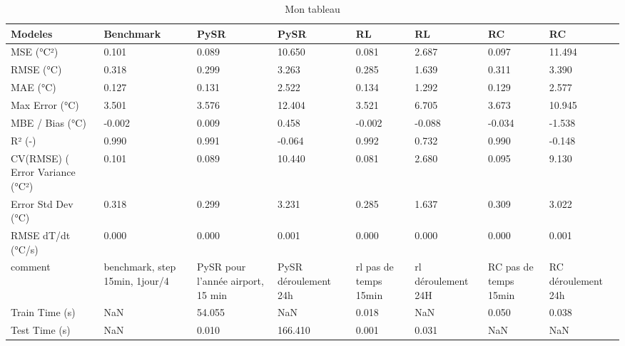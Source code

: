 \begin{table}
\caption{Mon tableau}
\label{tab:mon_tableau}
\begin{tabular}{llllllll}
\toprule
Modeles & Benchmark & PySR & PySR & RL & RL & RC & RC \\
\midrule
MSE (°C²) & 0.101 & 0.089 & 10.650 & 0.081 & 2.687 & 0.097 & 11.494 \\
RMSE (°C) & 0.318 & 0.299 & 3.263 & 0.285 & 1.639 & 0.311 & 3.390 \\
MAE (°C) & 0.127 & 0.131 & 2.522 & 0.134 & 1.292 & 0.129 & 2.577 \\
Max Error (°C) & 3.501 & 3.576 & 12.404 & 3.521 & 6.705 & 3.673 & 10.945 \\
MBE / Bias (°C) & -0.002 & 0.009 & 0.458 & -0.002 & -0.088 & -0.034 & -1.538 \\
R² (-) & 0.990 & 0.991 & -0.064 & 0.992 & 0.732 & 0.990 & -0.148 \\
CV(RMSE) (%
Error Variance (°C²) & 0.101 & 0.089 & 10.440 & 0.081 & 2.680 & 0.095 & 9.130 \\
Error Std Dev (°C) & 0.318 & 0.299 & 3.231 & 0.285 & 1.637 & 0.309 & 3.022 \\
RMSE dT/dt (°C/s) & 0.000 & 0.000 & 0.001 & 0.000 & 0.000 & 0.000 & 0.001 \\
comment & benchmark, step 15min, 1jour/4 & PySR pour l'année airport, 15 min & PySR déroulement 24h & rl pas de temps 15min & rl déroulement 24H & RC pas de temps 15min & RC déroulement 24h \\
Train Time (s) & NaN & 54.055 & NaN & 0.018 & NaN & 0.050 & 0.038 \\
Test Time (s) & NaN & 0.010 & 166.410 & 0.001 & 0.031 & NaN & NaN \\
\bottomrule
\end{tabular}
\end{table}
